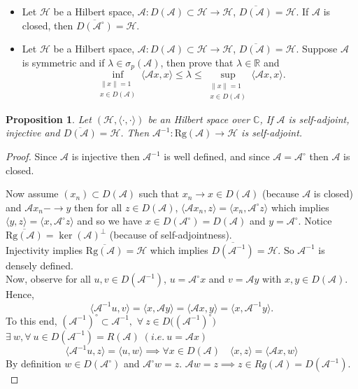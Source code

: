\documentclass[12pt, oneside]{book}
\newtheorem{prop}{Proposition}[section]
\newcommand{\norm}[1]{\left\lVert#1\right\rVert}
\newcommand{\A}{\mathscr{A}}
\begin{document}
\begin{exercise}{}{}
\begin{itemize}
	\item [1.]Let $\mathscr{H}$ be a Hilbert space, $\mathscr{A}:D(\mathscr{A})\subset \mathscr{H}\to \mathscr{H}$, $\overline{D(\mathscr{A})}=\mathscr{H}$. If $\mathscr{A}$ is closed, then $\overline{D(\mathscr{A}^{\circ})}=\mathscr{H}$.
	\item [2.] Let $\mathscr{H}$ be a Hilbert space, $\mathscr{A}:D(\mathscr{A})\subset \mathscr{H}\to \mathscr{H}$, $\overline{D(\mathscr{A})}=\mathscr{H}$. Suppose $\mathscr{A}$ is symmetric and if $\lambda \in \sigma_{p}(\mathscr{A})$, then prove that $\lambda\in\mathbb{R}$ and
	\[
		\inf_{\substack{\norm{x} = 1 \\ x \in D(\A)}}\langle \A x,x\rangle
	\le \lambda \le
	\sup_{\substack{\norm{x} = 1 \\ x \in D(\A)}}\langle \A x,x\rangle.
	\]
\end{itemize}
\end{exercise}
\begin{prop}
Let	$(\mathscr{H},\langle\cdot,\cdot\rangle)$ be an Hilbert space over $\mathbb{C}$, If $\mathscr{A}$ is self-adjoint, injective and $\overline{D(\mathscr{A})}=\mathscr{H}$. 	
Then $\mathscr{A}^{-1}:\mathrm{Rg}(\mathscr{A})\to \mathscr{H}$ is self-adjoint.
\end{prop}
\begin{proof}
Since $\A$ is injective then $\A^{-1}$ is well defined, and since $\A = \A^{\circ}$ then $\A$ is closed.

Now assume $(x_n) \subset D(\A)$ such that $x_n \to x \in D(\A)$ (because $\A$ is closed) and $\A x_n -\to y$ then for all $z\in D(\A)$, $\langle\A x_n,z\rangle=\langle x_n,\A^{\circ}z\rangle$ which implies $\langle y,z\rangle=\langle x,\mathscr{A}^{\circ}z\rangle$ and so we have $x\in D(\mathscr{A}^{\circ})=D(\mathscr{A})$ and $y=\mathscr{A}^{\circ}$. Notice $\overline{\mathrm{Rg}(\mathscr{A})}=\ker(\mathscr{A})^{\perp}$ (because of self-adjointness).\\
Injectivity implies $\overline{\mathrm{Rg}(\mathscr{A})}=\mathscr{H}$ which implies $\overline{D(\mathscr{A}^{-1})}=\mathscr{H}$. So $\mathscr{A}^{-1}$ is densely defined.\\
Now, observe for all $u,v\in D(\mathscr{A}^{-1})$, $u=\mathscr{A}^{\circ}x$ and $v=\mathscr{A} y$ with $x,y\in D(\mathscr{A})$. Hence,
\vspace{-2mm}
$$\langle \mathscr{A}^{-1}u,v\rangle =\langle x,\mathscr{A}y\rangle=\langle \mathscr{A} x,y\rangle =\langle x, \mathscr{A}^{-1}y\rangle.$$
To this end, $
(\mathscr{A}^{-1})^{\circ} \subset \mathscr{A}^{-1},$
$
\forall\ z \in D\big((\mathscr{A}^{-1})^{\circ}\big)
$
$
\exists\  w,\forall \ u \in D(\mathscr{A}^{-1}) = R(\mathscr{A}) \; (i.e.\ u= \mathscr{A}x)
$
\[
\langle \mathscr{A}^{-1}u, z \rangle
= \langle u, w \rangle
\implies \forall x \in D(\mathscr{A})
\quad
\langle x, z \rangle
= \langle \mathscr{A}x, w \rangle
\]
By definition $w \in D(\mathscr{A}^{\circ})$ and $\mathscr{A}^{\circ} w = z$.
$
\mathscr{A}w = z
\implies
z \in Rg(\mathscr{A}) = D(\mathscr{A}^{-1}).
$
\end{proof}
\end{document}
